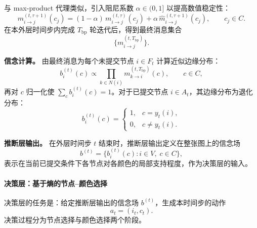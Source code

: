 与 max-product 代理类似，引入阻尼系数 $\alpha\in(0,1]$ 以提高数值稳定性：
\begin{equation}
  m_{i\to j}^{(t,\tau+1)}(c_j)
  =
  (1-\alpha)\,m_{i\to j}^{(t,\tau)}(c_j)
  +
  \alpha\,\hat{m}_{i\to j}^{(t,\tau+1)}(c_j),
  \qquad c_j\in C.
\end{equation}
在本外层时间步内完成 $T_{\mathrm{bp}}$ 轮迭代后，得到最终消息集合
\begin{equation}
  \bigl\{ m_{i\to j}^{(t,T_{\mathrm{bp}})} \bigr\}.
\end{equation}

\textbf{信念计算。}
由最终消息为每个未提交节点 $i\in F_t$ 计算近似边缘分布：
\begin{equation}
  b_i^{(t)}(c)
  \propto
  \prod_{k\in N(i)} m_{k\to i}^{(t,T_{\mathrm{bp}})}(c),
  \qquad c\in C,
\end{equation}
再对 $c$ 归一化使 $\sum_{c} b_i^{(t)}(c)=1$。对于已提交节点 $i\in A_t$，其边缘分布为退化分布：
\begin{equation}
  b_i^{(t)}(c)=
  \begin{cases}
    1, & c=y_t(i),\\
    0, & c\neq y_t(i).
  \end{cases}
\end{equation}

\textbf{推断层输出。}
在外层时间步 $t$ 结束时，推断层输出定义在整张图上的信念场
\begin{equation}
  b^{(t)}=\bigl\{ b_i^{(t)}(c): i\in V,\; c\in C \bigr\},
\end{equation}
表示在当前已提交条件下各节点对各颜色的局部支持程度，作为决策层的输入。

\paragraph{决策层：基于熵的节点--颜色选择}
决策层的任务是：给定推断层输出的信念场 $b^{(t)}$，生成本时间步的动作
\begin{equation}
  a_t=(i_t,c_t).
\end{equation}
决策过程分为节点选择与颜色选择两个阶段。


